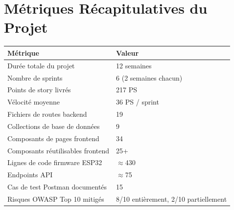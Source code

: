 \section{Métriques Récapitulatives du Projet}

\begin{center}
\begin{tabular}{ll}
\toprule
\textbf{Métrique} & \textbf{Valeur} \\
\midrule
Durée totale du projet             & 12 semaines \\
Nombre de sprints                  & 6 (2 semaines chacun) \\
Points de story livrés             & 217 PS \\
Vélocité moyenne                   & 36 PS / sprint \\
Fichiers de routes backend         & 19 \\
Collections de base de données     & 9 \\
Composants de pages frontend       & 34 \\
Composants réutilisables frontend  & 25+ \\
Lignes de code firmware ESP32      & $\approx$430 \\
Endpoints API                      & $\approx$75 \\
Cas de test Postman documentés     & 15 \\
Risques OWASP Top 10 mitigés       & 8/10 entièrement, 2/10 partiellement \\
\bottomrule
\end{tabular}
\end{center}

